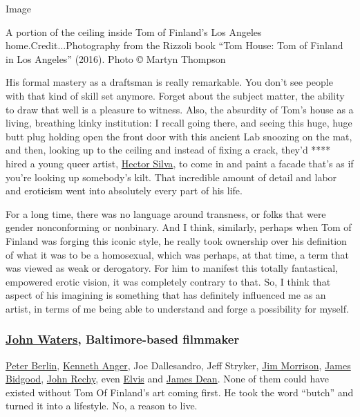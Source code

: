 Image

A portion of the ceiling inside Tom of Finland's Los Angeles
home.Credit...Photography from the Rizzoli book ``Tom House: Tom of
Finland in Los Angeles'' (2016). Photo © Martyn Thompson

His formal mastery as a draftsman is really remarkable. You don't see
people with that kind of skill set anymore. Forget about the subject
matter, the ability to draw that well is a pleasure to witness. Also,
the absurdity of Tom's house as a living, breathing kinky institution: I
recall going there, and seeing this huge, huge butt plug holding open
the front door with this ancient Lab snoozing on the mat, and then,
looking up to the ceiling and instead of fixing a crack, they'd ****
hired a young queer artist,
\href{http://www.worldoftomoffinland.com/tomsblog/weekly-artist-focus-hector-silva/}{Hector
Silva}, to come in and paint a facade that's as if you're looking up
somebody's kilt. That incredible amount of detail and labor and
eroticism went into absolutely every part of his life.

For a long time, there was no language around transness, or folks that
were gender nonconforming or nonbinary. And I think, similarly, perhaps
when Tom of Finland was forging this iconic style, he really took
ownership over his definition of what it was to be a homosexual, which
was perhaps, at that time, a term that was viewed as weak or derogatory.
For him to manifest this totally fantastical, empowered erotic vision,
it was completely contrary to that. So, I think that aspect of his
imagining is something that has definitely influenced me as an artist,
in terms of me being able to understand and forge a possibility for
myself.

\hypertarget{john-waters-baltimore-based-filmmaker}{%
\subsubsection{\texorpdfstring{\textbf{\href{https://www.nytimes3xbfgragh.onion/2015/11/20/t-magazine/my-10-favorite-books-john-waters.html}{John
Waters}, Baltimore-based
filmmaker}}{John Waters, Baltimore-based filmmaker}}\label{john-waters-baltimore-based-filmmaker}}

\href{https://www.nytimes3xbfgragh.onion/2019/11/27/style/peter-berlin-the-70s-gay-sex-symbol-takes-new-york.html}{Peter
Berlin}, \href{https://www.kennethanger.org/}{Kenneth Anger}, Joe
Dallesandro, Jeff Stryker,
\href{https://www.nytimes3xbfgragh.onion/1971/07/09/archives/jim-morrison-25-lead-singer-with-doors-rock-group-dies.html}{Jim
Morrison},
\href{https://www.nytimes3xbfgragh.onion/2011/03/20/magazine/mag-20Bidgood-t.html}{James
Bidgood},
\href{https://www.nytimes3xbfgragh.onion/2013/12/01/us/a-first-gay-novel-a-poor-latino-boyhood-and-the-confluence.html}{John
Rechy}, even
\href{https://www.nytimes3xbfgragh.onion/topic/person/elvis-presley}{Elvis}
and
\href{https://www.nytimes3xbfgragh.onion/topic/person/james-dean}{James
Dean}. None of them could have existed without Tom Of Finland's art
coming first. He took the word ``butch'' and turned it into a lifestyle.
No, a reason to live.

